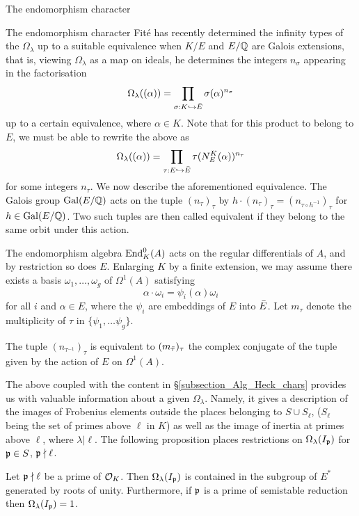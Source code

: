 \documentclass[11pt,a4paper]{article}
\newcommand{\lam}{\lambda}
\begin{document}
\begin{section}{The endomorphism character}
\begin{subsection}{The endomorphism character}
Fité has recently determined the infinity types of the $\Omega_\lambda$ up to a suitable equivalence when $K/E$ and $E/\mathbb{Q}$ are Galois extensions, that is, viewing $\Omega_\lambda$ as a map on ideals, he determines the integers $n_\sigma$ appearing in the factorisation 
\[ \Omega_\lambda((\alpha)) = \prod_{\sigma:K \hookrightarrow \Bar{E}} \sigma(\alpha)^{n_\sigma}
\]
up to a certain equivalence, where $\alpha \in K$. Note that for this product to belong to $E$, we must be able to rewrite the above as
\[ \Omega_\lambda((\alpha)) = \prod_{\tau: E \hookrightarrow \Bar{E}} \tau(N^K_E(\alpha))^{n_\tau}
\]
for some integers $n_\tau$.
We now describe the aforementioned  equivalence.
The Galois group $\Gal(E/\QQ)$ acts on the tuple  $(n_\tau)_\tau$ by $h \cdot (n_\tau)_\tau = (n_{\tau \circ h^{-1}})_\tau$ for $h \in \Gal(E/\QQ)$.
Two such tuples are then called equivalent if they belong to the same orbit under this action.

The endomorphism algebra $\End_K^0(A)$ acts on the regular differentials of $A$, and by restriction so does $E$.
Enlarging $K$ by a finite extension, we may assume there exists a basis $\omega_1,\ldots, \omega_g $ of $\Omega^1(A)$ satisfying
$$\alpha\cdot\omega_i = \psi_i(\alpha)\omega_i$$
for all $i$ and $\alpha \in E$, where the $\psi_i$ are embeddings of $E$ into $\Bar{E}$. Let $m_\tau$ denote the multiplicity of $\tau$ in $\{\psi_1, \ldots \psi_g \}$.  

\begin{theorem}{\cite[Prop. 14]{Fite_Ordinary_primes}}
\label{thm_fite_inf_type_up_to_equiv}
The tuple $(n_{\tau^{-1}})_\tau$ is equivalent to $(m_{\Bar{\tau}})_\tau$ the complex conjugate of the tuple given by the action of $E$ on $\Omega^1(A)$.
\end{theorem}

The above coupled with the content in \S \ref{subsection_Alg_Heck_chars} provides us with valuable information about a given $\Omega_\lambda$.
Namely, it gives a description of the images of Frobenius elements outside the places belonging to $S \cup S_\ell$, ($S_\ell$ being the set of primes above $\ell$ in $K$) as well as the image of inertia at primes above  $\ell$, where $\lambda|\ell$.
The following proposition places restrictions on $\Omega_\lambda(I_{\mathfrak{p}})$ for $\mathfrak{p} \in S$, $\mathfrak{p} \nmid \ell$.

\begin{proposition}
\label{prop_endo_car_inertia_at_p_ne_l}
Let $\mathfrak{p} \nmid \ell $ be a prime of $ \mathcal{O}_K$. Then $\Omega_\lam(I_\p)$ is contained in the subgroup of $E^*$ generated by roots of unity.
Furthermore, if $\mathfrak{p}$ is a prime of semistable reduction then $\Omega_\lambda(I_{\mathfrak{p}})=1$.
\end{proposition}


\end{subsection}
\end{section}
\end{document}
